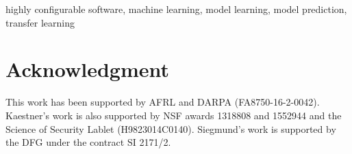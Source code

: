 \documentclass[10pt,conference]{IEEEtran}
\begin{document}
\begin{IEEEkeywords}
highly configurable software, machine learning, model learning, model prediction, transfer learning

\end{IEEEkeywords}





%
%



\section*{Acknowledgment}
This work has been supported by AFRL and DARPA (FA8750-16-2-0042). Kaestner's work is also supported by NSF awards 1318808 and 1552944 and the Science of Security Lablet (H9823014C0140). Siegmund's work is supported by the DFG under the contract SI 2171/2.

\newpage


{\footnotesize
}

%
\end{document}
